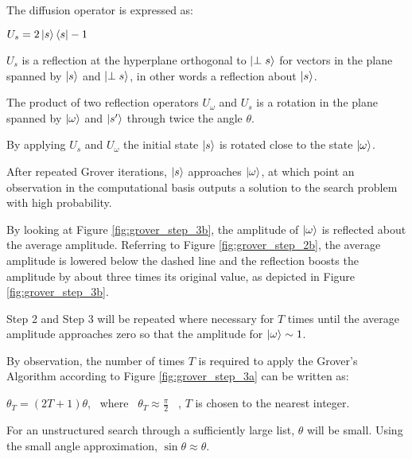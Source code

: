 \documentclass{article}
\begin{document}
\noindent
The diffusion operator is expressed as:
\vspace{5mm}

\qquad $U_s  = 2 \ket{s}\bra{s} - 1$
\vspace{5mm}

\noindent
$U_s$ is a reflection at the hyperplane orthogonal to $\ket{\perp s}$  for vectors in the plane spanned by $\ket{s}$  and $\ket{\perp s}$, in other words a reflection about $\ket{s}$. 
\vspace{5mm}

\noindent
The product of two reflection operators $U_\omega$ and $U_s$ is a rotation in the plane spanned by $\ket{\omega}$ and $\ket{s'}$ through twice the angle $\theta$.
\vspace{5mm}

\noindent
By applying $U_s$ and $U_\omega$ the initial state $\ket{s}$ is rotated close to the state $\ket{\omega}$.
\vspace{5mm}

\noindent
After repeated Grover iterations, $\ket{s}$ approaches $\ket{\omega}$, at which point an observation in the computational basis
outputs a solution to the search problem with high probability.
\vspace{5mm}

\noindent
By looking at Figure \ref{fig:grover_step_3b}, the amplitude of $\ket{\omega}$ is reflected about the average amplitude. Referring to Figure \ref{fig:grover_step_2b}, the average amplitude is lowered below the dashed line and the reflection boosts the amplitude by about three times its original value, as depicted in Figure \ref{fig:grover_step_3b}.
\vspace{5mm}

\noindent
Step 2 and Step 3 will be repeated where necessary for $T$ times until the average amplitude approaches zero so that the amplitude for $\ket{\omega} \sim 1$\cite{de_wolf_main_nodate}.
\vspace{5mm}

\noindent
By observation, the number of times $T$ is required to apply the Grover's Algorithm according to Figure \ref{fig:grover_step_3a} can be written as:
\vspace{5mm}

\noindent
\qquad $\theta_T = (2T + 1)\theta$, \ where \ $\theta_T \approx \frac{\pi}{2}$ \ , $T$ is chosen to the nearest integer. 
\vspace{5mm}

\noindent
For an unstructured search through a sufficiently large list, $\theta$ will be small. Using the small angle approximation, $\sin\theta \approx \theta$. 
\vspace{5mm}
\end{document}

